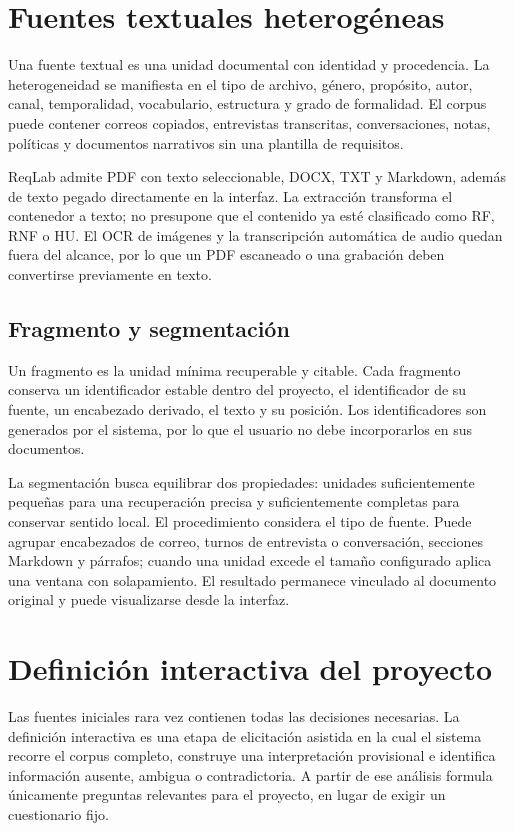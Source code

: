 \section{Fuentes textuales heterogéneas}

Una fuente textual es una unidad documental con identidad y procedencia. La heterogeneidad se manifiesta en el tipo de archivo, género, propósito, autor, canal, temporalidad, vocabulario, estructura y grado de formalidad. El corpus puede contener correos copiados, entrevistas transcritas, conversaciones, notas, políticas y documentos narrativos sin una plantilla de requisitos.

ReqLab admite PDF con texto seleccionable, DOCX, TXT y Markdown, además de texto pegado directamente en la interfaz. La extracción transforma el contenedor a texto; no presupone que el contenido ya esté clasificado como RF, RNF o HU. El OCR de imágenes y la transcripción automática de audio quedan fuera del alcance, por lo que un PDF escaneado o una grabación deben convertirse previamente en texto.

\subsection{Fragmento y segmentación}

Un fragmento es la unidad mínima recuperable y citable. Cada fragmento conserva un identificador estable dentro del proyecto, el identificador de su fuente, un encabezado derivado, el texto y su posición. Los identificadores son generados por el sistema, por lo que el usuario no debe incorporarlos en sus documentos.

La segmentación busca equilibrar dos propiedades: unidades suficientemente pequeñas para una recuperación precisa y suficientemente completas para conservar sentido local. El procedimiento considera el tipo de fuente. Puede agrupar encabezados de correo, turnos de entrevista o conversación, secciones Markdown y párrafos; cuando una unidad excede el tamaño configurado aplica una ventana con solapamiento. El resultado permanece vinculado al documento original y puede visualizarse desde la interfaz.

\section{Definición interactiva del proyecto}

Las fuentes iniciales rara vez contienen todas las decisiones necesarias. La definición interactiva es una etapa de elicitación asistida en la cual el sistema recorre el corpus completo, construye una interpretación provisional e identifica información ausente, ambigua o contradictoria. A partir de ese análisis formula únicamente preguntas relevantes para el proyecto, en lugar de exigir un cuestionario fijo.


